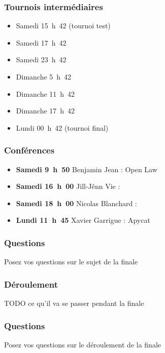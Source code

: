 \documentclass{beamer}
\begin{document}
\begin{frame}
    \frametitle{Tournois intermédiaires}
    \begin{itemize}
        \item Samedi 15~h~42 (tournoi test)
        \item Samedi 17~h~42
        \item Samedi 23~h~42
        \item Dimanche 5~h~42
        \item Dimanche 11~h~42
        \item Dimanche 17~h~42
        \item Lundi 00~h~42 (tournoi final)
    \end{itemize}
\end{frame}

\begin{frame}
    \frametitle{Conférences}
    \begin{itemize}
        \item \textbf{Samedi 9~h~50} Benjamin Jean : Open Law
        \item \textbf{Samedi 16~h~00} Jill-Jênn Vie :
        \item \textbf{Samedi 18~h~00} Nicolas Blanchard :
        \item \textbf{Lundi 11~h~45} Xavier Garrigue : Apycat
    \end{itemize}
\end{frame}

\begin{frame}
    \frametitle{Questions}
    Posez vos questions sur le sujet de la finale
\end{frame}

\begin{frame}
    \frametitle{Déroulement}
    TODO ce qu'il va se passer pendant la finale
\end{frame}

\begin{frame}
    \frametitle{Questions}
    Posez vos questions sur le déroulement de la finale
\end{frame}
\end{document}
